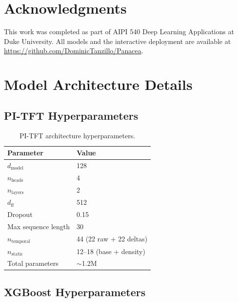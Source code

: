 \documentclass{article}
\begin{document}
\section*{Acknowledgments}

This work was completed as part of AIPI 540 Deep Learning Applications at Duke University. All models and the interactive deployment are available at \url{https://github.com/DominicTanzillo/Panacea}.




\appendix

\section{Model Architecture Details}
\label{app:architecture}

\subsection{PI-TFT Hyperparameters}

\begin{table}[h]
\centering
\caption{PI-TFT architecture hyperparameters.}
\label{tab:pitft-params}
\begin{tabular}{@{}ll@{}}
\toprule
Parameter & Value \\
\midrule
$d_{\text{model}}$ & 128 \\
$n_{\text{heads}}$ & 4 \\
$n_{\text{layers}}$ & 2 \\
$d_{\text{ff}}$ & 512 \\
Dropout & 0.15 \\
Max sequence length & 30 \\
$n_{\text{temporal}}$ & 44 (22 raw + 22 deltas) \\
$n_{\text{static}}$ & 12--18 (base + density) \\
Total parameters & $\sim$1.2M \\
\bottomrule
\end{tabular}
\end{table}

\subsection{XGBoost Hyperparameters}
\end{document}
